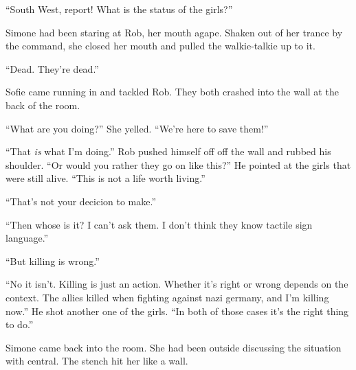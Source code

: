 \documentclass[letterpaper,12pt]{report}
\begin{document}
``South West, report! What is the status of the girls?''

Simone had been staring at Rob, her mouth agape. Shaken out of her trance by the command, she closed her mouth and pulled the walkie-talkie up to it.

``Dead. They're dead.''

Sofie came running in and tackled Rob. They both crashed into the wall at the back of the room.

``What are you doing?'' She yelled. ``We're here to save them!''

``That \textit{is} what I'm doing.'' Rob pushed himself off off the wall and rubbed his shoulder. ``Or would you rather they go on like this?'' He pointed at the girls that were still alive. ``This is not a life worth living.''

``That's not your decicion to make.''

``Then whose is it? I can't ask them. I don't think they know tactile sign language.''

``But killing is wrong.''

``No it isn't. Killing is just an action. Whether it's right or wrong depends on the context. The allies killed when fighting against nazi germany, and I'm killing now.'' He shot another one of the girls. ``In both of those cases it's the right thing to do.''
\act

Simone came back into the room. She had been outside discussing the situation with central. The stench hit her like a wall.
\end{document}
